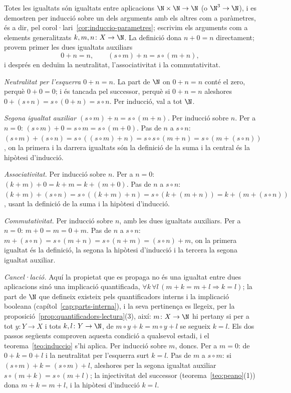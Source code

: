 \begin{prova}
Totes les igualtats són igualtats entre aplicacions \(\N\times\N\to\N\)
(o \(\N^3\to\N\)), i es demostren per inducció sobre un dels arguments amb
els altres com a paràmetres, és a dir, pel
corol·lari~\ref{cor:induccio-parametres}; escrivim els arguments com a
elements generalitzats \(k,m,n\colon X\to\N\). La definició dona
\(n+0=n\) directament; provem primer les dues igualtats auxiliars
\[
0+n=n,
\qquad
(s\circ m)+n=s\circ(m+n),
\]
i després en deduïm la neutralitat, l'associativitat i la commutativitat.

\emph{Neutralitat per l'esquerra \(0+n=n\).} La part de \(\N\) on
\(0+n=n\) conté el zero, perquè \(0+0=0\); i és tancada pel successor,
perquè si \(0+n=n\) aleshores \(0+(s\circ n)=s\circ(0+n)=s\circ n\). Per
inducció, val a tot \(\N\).

\emph{Segona igualtat auxiliar \((s\circ m)+n=s\circ(m+n)\).} Per inducció
sobre \(n\). Per a \(n=0\): \((s\circ m)+0=s\circ m=s\circ(m+0)\). Pas de
\(n\) a \(s\circ n\): \((s\circ m)+(s\circ n)=s\circ((s\circ m)+n)
=s\circ s\circ(m+n)=s\circ(m+(s\circ n))\), on la primera i la darrera
igualtats són la definició de la suma i la central és la hipòtesi
d'inducció.

\emph{Associativitat.} Per inducció sobre \(n\). Per a \(n=0\):
\((k+m)+0=k+m=k+(m+0)\). Pas de \(n\) a \(s\circ n\):
\((k+m)+(s\circ n)=s\circ((k+m)+n)=s\circ(k+(m+n))=k+(m+(s\circ n))\),
usant la definició de la suma i la hipòtesi d'inducció.

\emph{Commutativitat.} Per inducció sobre \(n\), amb les dues igualtats
auxiliars. Per a \(n=0\): \(m+0=m=0+m\). Pas de \(n\) a \(s\circ n\):
\(m+(s\circ n)=s\circ(m+n)=s\circ(n+m)=(s\circ n)+m\), on la primera
igualtat és la definició, la segona la hipòtesi d'inducció i la tercera la
segona igualtat auxiliar.

\emph{Cancel·lació.} Aquí la propietat que es propaga no és una igualtat
entre dues aplicacions sinó una implicació quantificada,
\(\forall k\,\forall l\,(m+k=m+l\Rightarrow k=l)\); la part de \(\N\) que
defineix existeix pels quantificadors interns i la implicació booleana
(capítol~\ref{cap:parts-interna}), i la seva pertinença es llegeix, per la
proposició~\ref{prop:quantificadors-lectura}(3), així: \(m\colon X\to\N\) hi
pertany si per a tot \(y\colon Y\to X\) i tots \(k,l\colon Y\to\N\), de
\(m\circ y+k=m\circ y+l\) se segueix \(k=l\). Els dos passos següents
comproven aquesta condició a qualsevol estadi, i el
teorema~\ref{teo:induccio} s'hi aplica. Per inducció sobre \(m\), doncs. Per a \(m=0\): de
\(0+k=0+l\) i la neutralitat per l'esquerra surt \(k=l\). Pas de \(m\) a
\(s\circ m\): si \((s\circ m)+k=(s\circ m)+l\), aleshores per la segona
igualtat auxiliar \(s\circ(m+k)=s\circ(m+l)\); la injectivitat del
successor (teorema~\ref{teo:peano}(1)) dona
\(m+k=m+l\), i la hipòtesi d'inducció \(k=l\).


\end{prova}
